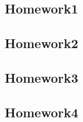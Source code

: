\documentclass[../main.tex]{subfiles}
\begin{document}
\subsection{Homework1}

\newpage

\subsection{Homework2}

\newpage

\subsection{Homework3}

\newpage

\subsection{Homework4}

\newpage
\end{document}

